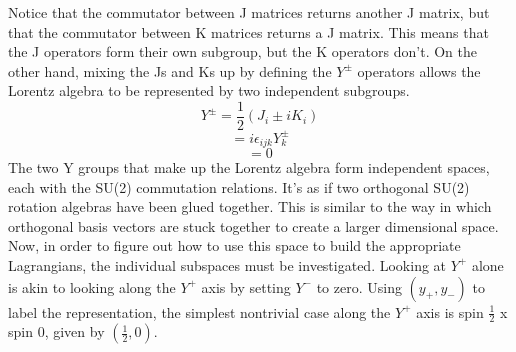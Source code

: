 \documentclass[12pt]{article}
\begin{document}
Notice that the commutator between J matrices returns another J matrix, but that the commutator between K matrices returns a J matrix. This means that the J operators form their own subgroup, but the K operators don't. On the other hand, mixing the Js and Ks up by defining the $Y^{\pm}$ operators allows the Lorentz algebra to be represented by two independent subgroups. 
\begin{equation}
Y^{\pm} = \frac{1}{2}(J_i \pm iK_i)
\end{equation}
\begin{equation}
[Y^{\pm}_i, Y^{\pm}_j] = i\epsilon_{ijk}Y^{\pm}_k
\end{equation}
\begin{equation}
[Y^{\pm}_i, Y^{\mp}_j] = 0
\end{equation}
The two Y groups that make up the Lorentz algebra form independent spaces, each with the SU(2) commutation relations. It's as if two orthogonal SU(2) rotation algebras have been glued together. This is similar to the way in which orthogonal basis vectors are stuck together to create a larger dimensional space. Now, in order to figure out how to use this space to build the appropriate Lagrangians, the individual subspaces must be investigated. Looking at $Y^{+}$ alone is akin to looking along the $Y^{+}$ axis by setting $Y^{-}$ to zero. Using $(y_+, y_-)$ to label the representation, the simplest nontrivial case along the $Y^{+}$ axis is spin $\frac{1}{2}$ x spin 0, given by $(\frac{1}{2}, 0)$.   
\end{document}

